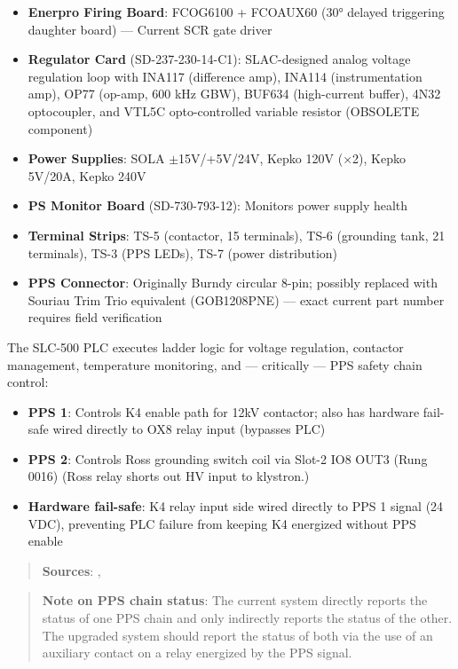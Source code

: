 \begin{itemize}
\tightlist
\item
  \textbf{Enerpro Firing Board}: FCOG6100 + FCOAUX60 (30° delayed triggering daughter board) --- Current SCR gate driver
\item
  \textbf{Regulator Card} (SD-237-230-14-C1): SLAC-designed analog voltage regulation loop with INA117 (difference amp), INA114 (instrumentation amp), OP77 (op-amp, 600 kHz GBW), BUF634 (high-current buffer), 4N32 optocoupler, and VTL5C opto-controlled variable resistor (OBSOLETE component)
\item
  \textbf{Power Supplies}: SOLA $\pm$15V/+5V/24V, Kepko 120V (×2), Kepko 5V/20A, Kepko 240V
\item
  \textbf{PS Monitor Board} (SD-730-793-12): Monitors power supply health
\item
  \textbf{Terminal Strips}: TS-5 (contactor, 15 terminals), TS-6 (grounding tank, 21 terminals), TS-3 (PPS LEDs), TS-7 (power distribution)
\item
  \textbf{PPS Connector}: Originally Burndy circular 8-pin; possibly replaced with Souriau Trim Trio equivalent (GOB1208PNE) --- exact current part number requires field verification
\end{itemize}

The SLC-500 PLC executes ladder logic for voltage regulation, contactor management, temperature monitoring, and --- critically --- PPS safety chain control:

\begin{itemize}
\tightlist
\item
  \textbf{PPS 1}: Controls K4 enable path for 12kV contactor; also has hardware fail-safe wired directly to OX8 relay input (bypasses PLC)
\item
  \textbf{PPS 2}: Controls Ross grounding switch coil via Slot-2 IO8 OUT3 (Rung 0016) (Ross relay shorts out HV input to klystron.)
\item
  \textbf{Hardware fail-safe}: K4 relay input side wired directly to PPS 1 signal (24 VDC), preventing PLC failure from keeping K4 energized without PPS enable
\end{itemize}

\begin{quote}
\textbf{Sources}: , 
\end{quote}

\begin{quote}
\textbf{Note on PPS chain status}: The current system directly reports the status of one PPS chain and only indirectly reports the status of the other. The upgraded system should report the status of both via the use of an auxiliary contact on a relay energized by the PPS signal.
\end{quote}

